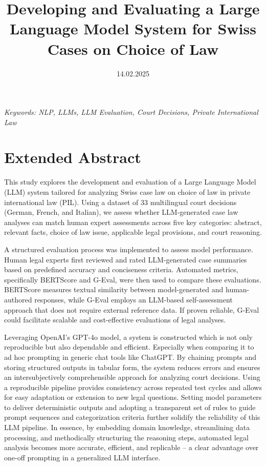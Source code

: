 \documentclass[a4paper,12pt]{article}
\title{Developing and Evaluating a Large Language Model System for Swiss Cases on Choice of Law}
\date{14.02.2025}
\begin{document}
\maketitle
\thispagestyle{fancy}

\begin{center}
\textit{Keywords: NLP, LLMs, LLM Evaluation, Court Decisions, Private International Law}
\newline
\end{center}

\section*{Extended Abstract}

This study explores the development and evaluation of a Large Language Model (LLM) system tailored for analyzing Swiss case law on choice of law in private international law (PIL). Using a dataset of 33 multilingual court decisions (German, French, and Italian), we assess whether LLM-generated case law analyses can match human expert assessments across five key categories: abstract, relevant facts, choice of law issue, applicable legal provisions, and court reasoning.

A structured evaluation process was implemented to assess model performance. Human legal experts first reviewed and rated LLM-generated case summaries based on predefined accuracy and conciseness criteria. Automated metrics, specifically BERTScore and G-Eval, were then used to compare these evaluations. BERTScore measures textual similarity between model-generated and human-authored responses, while G-Eval employs an LLM-based self-assessment approach that does not require external reference data. If proven reliable, G-Eval could facilitate scalable and cost-effective evaluations of legal analyses.

Leveraging OpenAI’s GPT-4o model, a system is constructed which is not only reproducible but also dependable and efficient. Especially when comparing it to ad hoc prompting in generic chat tools like ChatGPT. By chaining prompts and storing structured outputs in tabular form, the system reduces errors and ensures an intersubjectively comprehensible approach for analyzing court decisions. Using a reproducible pipeline provides consistency across repeated test cycles and allows for easy adaptation or extension to new legal questions. Setting model parameters to deliver deterministic outputs and adopting a transparent set of rules to guide prompt sequences and categorization criteria further solidify the reliability of this LLM pipeline. In essence, by embedding domain knowledge, streamlining data processing, and methodically structuring the reasoning steps, automated legal analysis becomes more accurate, efficient, and replicable – a clear advantage over one-off prompting in a generalized LLM interface. 
\end{document}
